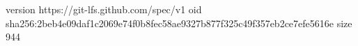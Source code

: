 version https://git-lfs.github.com/spec/v1
oid sha256:2beb4e09daf1c2069e74f0b8fec58ae9327b877f325c49f357eb2ce7efe5616e
size 944
